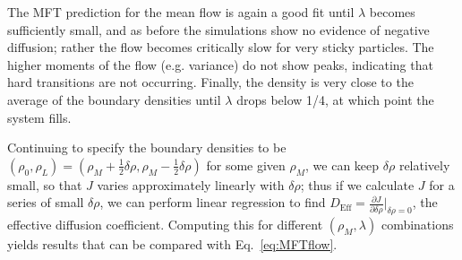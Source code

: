 \documentclass[
reprint,
 amsmath,amssymb,
 aps,
 prl,
]{revtex4-1}
\newcommand{\partDeriv}[2]{\frac{\partial #1}{\partial #2}}
\begin{document}
\begin{figure}[h!]
\begin{center}
\begin{tabular}{c}
    \end{tabular}
\end{center}
    \vspace{-2.5em}
\end{figure}
The MFT prediction for the mean flow is again a good fit until $\lambda$ becomes sufficiently small,
and as before the simulations show no evidence of negative diffusion; rather the flow becomes critically slow for very sticky particles.
The higher moments of the flow (e.g. variance) do not show peaks, indicating that hard transitions are not occurring.
Finally, the density is very close to the average of the boundary densities until $\lambda$ drops below 1/4, at which point the system fills.

Continuing to specify the boundary densities to be $(\rho_0, \rho_L) = (\rho_M + \frac{1}{2} \delta\rho, \rho_M - \frac{1}{2} \delta\rho)$ for some given $\rho_M$, we can keep $\delta\rho$ relatively small, so that $J$ varies approximately
linearly with $\delta\rho$; thus if we calculate $J$ for a series of small $\delta \rho$, we can perform linear regression to find $D_\mathrm{Eff}=\partDeriv{J}{\delta\rho}\big|_{\delta\rho=0}$, the effective diffusion coefficient.
Computing this for different $(\rho_M, \lambda)$ combinations yields results that can be compared with Eq.~\ref{eq:MFTflow}.
\end{document}
